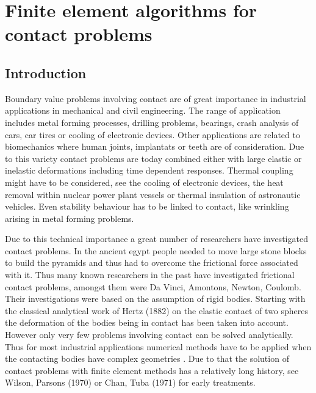 
\chapter{ Finite element algorithms for contact problems \parencite{CONTACTBOOK} \parencite{ref4} } %

\label{Chapter4} %


\section{Introduction}
Boundary value problems involving contact are of great importance in industrial applications
in mechanical and civil engineering. The range of application includes metal forming
processes, drilling problems, bearings, crash analysis of cars, car tires or cooling of electronic
devices. Other applications are related to biomechanics where human joints, implantats or
teeth are of consideration. Due to this variety contact problems are today combined either
with large elastic or inelastic deformations including time dependent responses. Thermal
coupling might have to be considered, see the cooling of electronic devices, the heat removal
within nuclear power plant vessels or thermal insulation of astronautic vehicles. Even
stability behaviour has to be linked to contact, like wrinkling arising in metal forming
problems.

Due to this technical importance a great number of researchers have investigated contact
problems. In the ancient egypt people needed to move large stone blocks to build the
pyramids and thus had to overcome the frictional force associated with it. Thus many known
researchers in the past have investigated frictional contact problems, amongst them were
Da Vinci, Amontons, Newton, Coulomb. Their investigations were based on the assumption
of rigid bodies. Starting with the classical analytical work of Hertz (1882) on the elastic
contact of two spheres the deformation of the bodies being in contact has been taken into
account. However only very few problems involving contact can be solved analytically. Thus
for most industrial applications numerical methods have to be applied when the contacting
bodies have complex geometries . Due to that the solution of contact problems with ﬁnite
element methods has a relatively long history, see Wilson, Parsons (1970) or Chan, Tuba
(1971) for early treatments.

